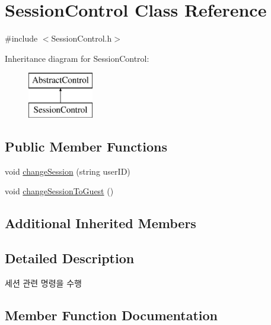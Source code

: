 \hypertarget{class_session_control}{}\section{Session\+Control Class Reference}
\label{class_session_control}


{\ttfamily \#include $<$Session\+Control.\+h$>$}

Inheritance diagram for Session\+Control\+:\begin{figure}[H]
\begin{center}
\leavevmode
\includegraphics[height=2.000000cm]{class_session_control}
\end{center}
\end{figure}
\subsection*{Public Member Functions}
\begin{DoxyCompactItemize}
\item 
void \mbox{\hyperlink{class_session_control_a09ae13f1e995c6b83ece478921c0722f}{change\+Session}} (string user\+ID)
\item 
void \mbox{\hyperlink{class_session_control_a2b5ea3cfba3e5f303071845330a69069}{change\+Session\+To\+Guest}} ()
\end{DoxyCompactItemize}
\subsection*{Additional Inherited Members}


\subsection{Detailed Description}
세션 관련 명령을 수행 

\subsection{Member Function Documentation}
\mbox{\label{class_session_control_a09ae13f1e995c6b83ece478921c0722f}} 
